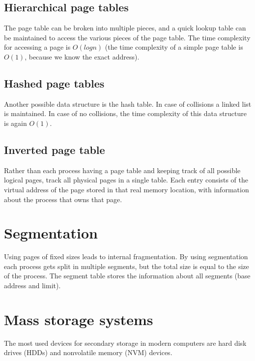 \subsection{Hierarchical page tables}
The page table can be broken into multiple pieces, and a quick lookup table can be maintained to access the various pieces of the page table. The time complexity for accessing a page is $O(logn)$ (the time complexity of a simple page table is $O(1)$, because we know the exact address).


\subsection{Hashed page tables}
Another possible data structure is the hash table. In case of collisions a linked list is maintained. In case of no collisions, the time complexity of this data structure is again $O(1)$.


\subsection{Inverted page table}
Rather than each process having a page table and keeping track of all possible logical pages, track all physical pages in a single table. Each entry consists of the virtual address of the page stored in that real memory location, with information about the process that owns that page.

\section{Segmentation}
Using pages of fixed sizes leads to internal fragmentation. By using segmentation each process gets split in multiple segments, but the total size is equal to the size of the process. The segment table stores the information about all segments (base address and limit). 


\section{Mass storage systems}
The most used devices for secondary storage in modern computers are hard disk drives (HDDs) and nonvolatile memory (NVM) devices.

